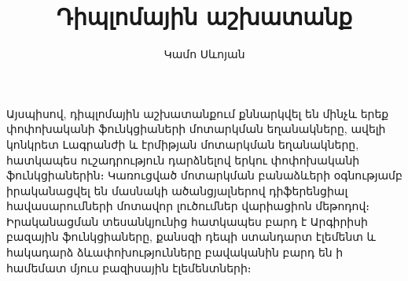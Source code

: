 \documentclass[fleqn, bachelor,subf,12pt,notitlepage]{article}
\title{Դիպլոմային աշխատանք}
\author{Կամո Սևոյան}
\begin{document}
\newpage
\section*{}
\sloppy

Այսպիսով, դիպլոմային աշխատանքում քննարկվել են մինչև երեք փոփոխականի ֆունկցիաների մոտարկման եղանակները, ավելի կոնկրետ Լագրանժի և էրմիթյան մոտարկման եղանակները, հատկապես ուշադրություն դարձնելով երկու փոփոխականի ֆունկցիաներին։ Կառուցված մոտարկման բանաձևերի օգնությամբ իրականացվել են մասնակի ածանցյալներով դիֆերենցիալ հավասարումների մոտավոր լուծումներ վարիացիոն մեթոդով։ Իրականացման տեսանկյունից հատկապես բարդ է Արգիրիսի բազային ֆունկցիաները, քանսզի դեպի ստանդարտ էլեմենտ և հակադարձ ձևափոխությունները բավականին բարդ են ի համեմատ մյուս բազիսային էլեմենտների։


\newpage
\section*{}
\end{document}
